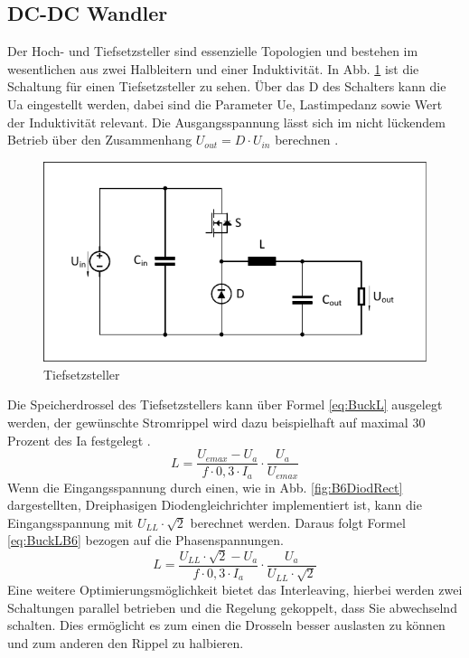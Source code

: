 		\subsection{DC-DC Wandler} \label{sec:Buck}
		Der Hoch- und Tiefsetzsteller sind essenzielle Topologien und bestehen im wesentlichen aus zwei Halbleitern und einer Induktivität. In Abb. \ref{fig:buck} ist die Schaltung für einen Tiefsetzsteller zu sehen. Über das \gls{D} des Schalters kann die \gls{Ua} eingestellt werden, dabei sind die Parameter \gls{Ue}, Lastimpedanz sowie Wert der Induktivität relevant. Die Ausgangsspannung lässt sich im nicht lückendem Betrieb über den Zusammenhang $U_{out}=D\cdot U_{in} $ berechnen \cite{schmidtwalter}.\\
		\begin{figure}
			\centering
			\includegraphics[width=0.7\linewidth]{content/Grafiken/Buck}
			\caption[Tiefsetzsteller]{Tiefsetzsteller}
			\label{fig:buck}
		\end{figure}
		Die Speicherdrossel des Tiefsetzstellers kann über Formel \ref{eq:BuckL} ausgelegt werden, der gewünschte Stromrippel wird dazu beispielhaft auf maximal 30 Prozent des \gls{Ia} festgelegt \cite{schmidtwalter}.
		\begin{equation}
			\label{eq:BuckL}
			L=\dfrac{U_{emax}-U_{a}}{f\cdot 0,3 \cdot I_{a}}\cdot \dfrac{U_{a}}{U_{emax}}
		\end{equation}
		Wenn die Eingangsspannung durch einen, wie in Abb. \ref{fig:B6DiodRect} dargestellten, Dreiphasigen Diodengleichrichter implementiert ist, kann die Eingangsspannung mit $U_{LL} \cdot \sqrt{2}$ berechnet werden. Daraus folgt Formel \ref{eq:BuckLB6} bezogen auf die Phasenspannungen. \\
		\begin{equation}
			\label{eq:BuckLB6}
			L=\dfrac{U_{LL} \cdot \sqrt{2}-U_{a}}{f\cdot 0,3 \cdot I_{a}}\cdot \dfrac{U_{a}}{U_{LL} \cdot \sqrt{2}}
		\end{equation}
		Eine weitere Optimierungsmöglichkeit bietet das Interleaving, hierbei werden zwei Schaltungen parallel betrieben und die Regelung gekoppelt, dass Sie abwechselnd schalten. Dies ermöglicht es zum einen die Drosseln besser auslasten zu können und zum anderen den Rippel zu halbieren. 
		
